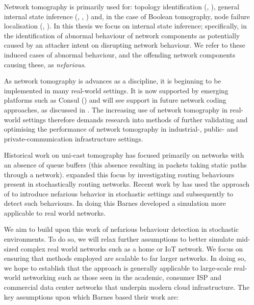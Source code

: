 Network tomography is primarily used for: topology identification (\cite{zhang_topology_2014}, \cite{hailiang_network_2009}), general internal state inference (\cite{vardi_network_1996}, \cite{coates_network_2001}, \cite{he_network_2021}) and, in the case of Boolean tomography, node failure localisation (\cite{nguyen_boolean_2007}, \cite{ma_optimal_2015}). In this thesis we focus on internal state inference; specifically, in the identification of abnormal behaviour of network components as potentially caused by an attacker intent on disrupting network behaviour. We refer to these induced cases of abnormal behaviour, and the offending network components causing these, as \textit{nefarious}.\par
As network tomography is advances as a discipline, it is beginning to be implemented in many real-world settings. It is now supported by emerging platforms such as Consul (\cite{shilton_network_2021}) and will see support in future network coding approaches, as discussed in \cite{kakkavas_review_2020}. The increasing use of network tomography in real-world settings therefore demands research into methods of further validating and optimising the performance of network tomography in industrial-, public- and private-communication infrastructure settings.\par
Historical work on uni-cast tomography has focused primarily on networks with an absence of queue buffers (this absence resulting in packets taking static paths through a network). \cite{lai_measuring_2000} expanded this focus by investigating routing behaviours present in stochastically routing networks. Recent work by \cite{barnes_stochastic_2020} has used the approach of \cite{lai_measuring_2000} to introduce nefarious behavior in stochastic settings and subsequently to detect such behaviours. In doing this Barnes developed a simulation more applicable to real world networks.\par
We aim to build upon this work of nefarious behaviour detection in stochastic environments. To do so, we will relax further assumptions to better simulate mid-sized complex real world networks such as a home or IoT network. We focus on ensuring that methods employed are scalable to far larger networks. In doing so, we hope to establish that the approach is generally applicable to large-scale real-world networking such as those seen in the academic, consumer ISP and commercial data center networks that underpin modern cloud infrastructure. The key assumptions upon which Barnes based their work are:\par
